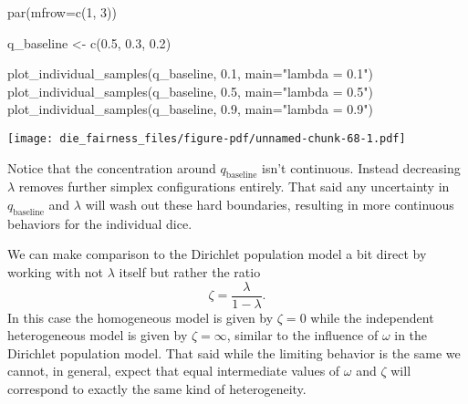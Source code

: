 \documentclass[
  letterpaper,
  DIV=11,
  numbers=noendperiod]{scrartcl}
\newenvironment{Shaded}{\begin{snugshade}}{\end{snugshade}}
\newcommand{\AttributeTok}[1]{\textcolor[rgb]{0.40,0.45,0.13}{#1}}
\newcommand{\ConstantTok}[1]{\textcolor[rgb]{0.56,0.35,0.01}{#1}}
\newcommand{\DecValTok}[1]{\textcolor[rgb]{0.68,0.00,0.00}{#1}}
\newcommand{\FloatTok}[1]{\textcolor[rgb]{0.68,0.00,0.00}{#1}}
\newcommand{\FunctionTok}[1]{\textcolor[rgb]{0.28,0.35,0.67}{#1}}
\newcommand{\NormalTok}[1]{\textcolor[rgb]{0.00,0.23,0.31}{#1}}
\newcommand{\OtherTok}[1]{\textcolor[rgb]{0.00,0.23,0.31}{#1}}
\newcommand{\SpecialCharTok}[1]{\textcolor[rgb]{0.37,0.37,0.37}{#1}}
\newcommand{\StringTok}[1]{\textcolor[rgb]{0.13,0.47,0.30}{#1}}
\begin{document}
\begin{Shaded}
\end{Shaded}

\begin{Shaded}
\begin{Highlighting}[]
\FunctionTok{par}\NormalTok{(}\AttributeTok{mfrow=}\FunctionTok{c}\NormalTok{(}\DecValTok{1}\NormalTok{, }\DecValTok{3}\NormalTok{))}

\NormalTok{q\_baseline }\OtherTok{\textless{}{-}} \FunctionTok{c}\NormalTok{(}\FloatTok{0.5}\NormalTok{, }\FloatTok{0.3}\NormalTok{, }\FloatTok{0.2}\NormalTok{)}

\FunctionTok{plot\_individual\_samples}\NormalTok{(q\_baseline, }\FloatTok{0.1}\NormalTok{, }\AttributeTok{main=}\StringTok{"lambda = 0.1"}\NormalTok{)}
\FunctionTok{plot\_individual\_samples}\NormalTok{(q\_baseline, }\FloatTok{0.5}\NormalTok{, }\AttributeTok{main=}\StringTok{"lambda = 0.5"}\NormalTok{)}
\FunctionTok{plot\_individual\_samples}\NormalTok{(q\_baseline, }\FloatTok{0.9}\NormalTok{, }\AttributeTok{main=}\StringTok{"lambda = 0.9"}\NormalTok{)}
\end{Highlighting}
\end{Shaded}

\texttt{[image: die\_fairness\_files/figure-pdf/unnamed-chunk-68-1.pdf]}

Notice that the concentration around \(q_{\mathrm{baseline}}\) isn't
continuous. Instead decreasing \(\lambda\) removes further simplex
configurations entirely. That said any uncertainty in
\(q_{\mathrm{baseline}}\) and \(\lambda\) will wash out these hard
boundaries, resulting in more continuous behaviors for the individual
dice.

We can make comparison to the Dirichlet population model a bit direct by
working with not \(\lambda\) itself but rather the ratio \[
\zeta = \frac{ \lambda }{ 1 - \lambda }.
\] In this case the homogeneous model is given by \(\zeta = 0\) while
the independent heterogeneous model is given by \(\zeta = \infty\),
similar to the influence of \(\omega\) in the Dirichlet population
model. That said while the limiting behavior is the same we cannot, in
general, expect that equal intermediate values of \(\omega\) and
\(\zeta\) will correspond to exactly the same kind of heterogeneity.
\end{document}
